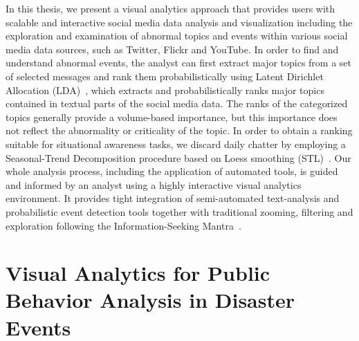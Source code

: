 In this thesis, we present a visual analytics approach that provides users with scalable and interactive social media data analysis and visualization including the exploration and examination of abnormal topics and events within various social media data sources, such as Twitter, Flickr and YouTube. 
In order to find and understand abnormal events, the analyst can first extract major topics from a set of selected messages and rank them probabilistically using Latent Dirichlet Allocation (LDA)~\cite{Blei:2003:LDA}, which extracts and probabilistically ranks major topics contained in textual parts of the social media data.
The ranks of the categorized topics generally provide a volume-based importance,
but this importance does not reflect the abnormality or criticality of the topic. 
In order to obtain a ranking suitable for situational awareness tasks, we discard daily chatter
by employing a Seasonal-Trend Decomposition procedure based on Loess smoothing (STL)~\cite{Cleveland:1990:SAS}.
Our whole analysis process, including the application of automated tools, is guided and informed by an analyst using a highly interactive visual analytics environment. 
It provides tight integration of semi-automated text-analysis and probabilistic event detection tools together with traditional zooming, filtering and exploration following the Information-Seeking Mantra~\cite{Shneiderman:1996:TEH}.


\section{Visual Analytics for Public Behavior Analysis in Disaster Events}

